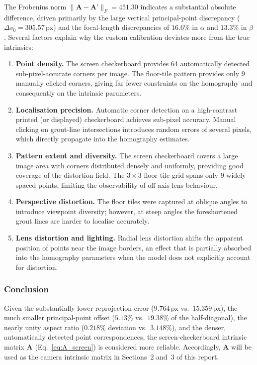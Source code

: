 \documentclass[11pt,a4paper]{article}
\begin{document}
The Frobenius norm $\|\mathbf{A}-\mathbf{A}'\|_F = 451.30$ indicates a
substantial absolute difference, driven primarily by the large vertical
principal-point discrepancy ($\Delta v_0 = 305.57\,\mathrm{px}$) and the
focal-length discrepancies of $16.6\%$ in $\alpha$ and $13.3\%$ in $\beta$.
Several factors explain why the custom calibration deviates more from
the true intrinsics:

\begin{enumerate}
    \item \textbf{Point density.}  The screen checkerboard provides 64 automatically
          detected sub-pixel-accurate corners per image.  The floor-tile pattern
          provides only 9 manually clicked corners, giving far fewer constraints
          on the homography and consequently on the intrinsic parameters.
    \item \textbf{Localisation precision.}  Automatic corner detection on a
          high-contrast printed (or displayed) checkerboard achieves sub-pixel
          accuracy.  Manual clicking on grout-line intersections introduces
          random errors of several pixels, which directly propagate into the
          homography estimates.
    \item \textbf{Pattern extent and diversity.}  The screen checkerboard covers a
          large image area with corners distributed densely and uniformly,
          providing good coverage of the distortion field.  The $3\times3$
          floor-tile grid spans only 9 widely spaced points, limiting the
          observability of off-axis lens behaviour.
    \item \textbf{Perspective distortion.}  The floor tiles were captured at
          oblique angles to introduce viewpoint diversity; however, at steep
          angles the foreshortened grout lines are harder to localise accurately.
    \item \textbf{Lens distortion and lighting.}  Radial lens distortion shifts
          the apparent position of points near the image borders, an effect that
          is partially absorbed into the homography parameters when the model
          does not explicitly account for distortion.
\end{enumerate}

\subsubsection*{Conclusion}

Given the substantially lower reprojection error ($9.764\,\mathrm{px}$ vs.\
$15.359\,\mathrm{px}$), the much smaller principal-point offset ($5.13\%$
vs.\ $19.38\%$ of the half-diagonal), the nearly unity aspect ratio
($0.218\%$ deviation vs.\ $3.148\%$), and the denser, automatically detected
point correspondences, the screen-checkerboard intrinsic matrix $\mathbf{A}$
(Eq.~\eqref{eq:A_screen}) is considered more reliable.
Accordingly, $\mathbf{A}$ will be used as the camera intrinsic matrix in
Sections~2 and~3 of this report.
\end{document}
